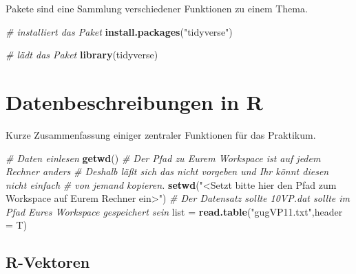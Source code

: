 \documentclass[]{book}
\newenvironment{Shaded}{\begin{snugshade}}{\end{snugshade}}
\newcommand{\KeywordTok}[1]{\textcolor[rgb]{0.13,0.29,0.53}{\textbf{#1}}}
\newcommand{\DataTypeTok}[1]{\textcolor[rgb]{0.13,0.29,0.53}{#1}}
\newcommand{\StringTok}[1]{\textcolor[rgb]{0.31,0.60,0.02}{#1}}
\newcommand{\CommentTok}[1]{\textcolor[rgb]{0.56,0.35,0.01}{\textit{#1}}}
\newcommand{\OperatorTok}[1]{\textcolor[rgb]{0.81,0.36,0.00}{\textbf{#1}}}
\newcommand{\NormalTok}[1]{#1}
\begin{document}
Pakete sind eine Sammlung verschiedener Funktionen zu einem Thema.

\begin{Shaded}
\begin{Highlighting}[]
\CommentTok{# installiert das Paket}
\KeywordTok{install.packages}\NormalTok{(}\StringTok{"tidyverse"}\NormalTok{)}

\CommentTok{# lädt das Paket}
\KeywordTok{library}\NormalTok{(tidyverse)}
\end{Highlighting}
\end{Shaded}

\chapter{Datenbeschreibungen in R}\label{datenbeschreibungen-in-r}

Kurze Zusammenfassung einiger zentraler Funktionen für das Praktikum.

\begin{Shaded}
\begin{Highlighting}[]
\CommentTok{# Daten einlesen}
\KeywordTok{getwd}\NormalTok{()}
\CommentTok{# Der Pfad zu Eurem Workspace ist auf jedem Rechner anders}
\CommentTok{# Deshalb läßt sich das nicht vorgeben und Ihr könnt diesen nicht einfach}
\CommentTok{# von jemand kopieren.}
\KeywordTok{setwd}\NormalTok{(}\StringTok{"<Setzt bitte hier den Pfad zum Workspace auf Eurem Rechner ein>"}\NormalTok{)}
\CommentTok{# Der Datensatz sollte 10VP.dat sollte im Pfad Eures Workspace gespeichert sein}
\NormalTok{list =}\StringTok{ }\KeywordTok{read.table}\NormalTok{(}\StringTok{"gugVP11.txt"}\NormalTok{,}\DataTypeTok{header =}\NormalTok{ T)}
\end{Highlighting}
\end{Shaded}

\begin{Shaded}
\end{Shaded}

\section{R-Vektoren}\label{r-vektoren}
\end{document}
